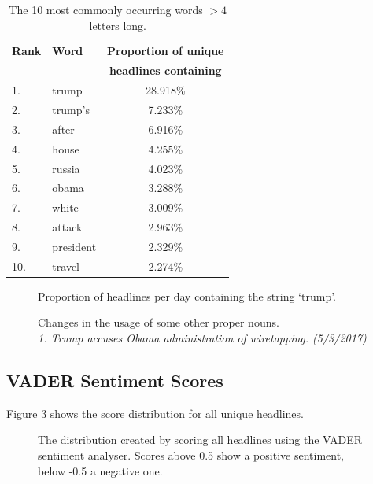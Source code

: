 \documentclass[a4paper,12pt]{article}
\begin{document}
\begin{table}[H]
    \centering
    \caption{The 10 most commonly occurring words $>4$ letters long.}
    \begin{tabular}{llc}
        \hline
        \textbf{Rank} & \textbf{Word} & \textbf{Proportion of unique} \\
                      &               & \textbf{headlines containing} \\
        \hline
        1. & trump & 28.918\% \\
        2. & trump's & 7.233\% \\
        3. & after & 6.916\% \\
        4. & house & 4.255\% \\
        5. & russia & 4.023\% \\
        6. & obama & 3.288\% \\
        7. & white & 3.009\% \\
        8. & attack & 2.963\% \\
        9. & president & 2.329\% \\
        10. & travel & 2.274\% \\
        \hline
    \end{tabular}
    \label{tab:most_common_words}
\end{table}


\begin{figure}[H]
    \centering
    
    \caption{Proportion of headlines per day containing the string `trump'.}
    \label{fig:trump_frequency_vs_time}
\end{figure}


\begin{figure}[H]
    \centering
    
    \caption{Changes in the usage of some other proper nouns. \\ \textit{1. Trump accuses Obama administration of wiretapping. (5/3/2017)}}
    \label{fig:word_frequency_vs_time}
\end{figure}


\subsection{VADER Sentiment Scores}
Figure \ref{fig:score_distribution_plot} shows the score distribution for all unique headlines. 

\begin{figure}[H]
    \centering
    
    \caption{The distribution created by scoring all headlines using the VADER sentiment analyser. Scores above 0.5 show a positive sentiment, below -0.5 a negative one.}
    \label{fig:score_distribution_plot}
\end{figure}
\end{document}
